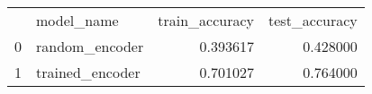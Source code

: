 \begin{tabular}{llrr}
 & model_name & train_accuracy & test_accuracy \\
0 & random_encoder & 0.393617 & 0.428000 \\
1 & trained_encoder & 0.701027 & 0.764000 \\
\end{tabular}

